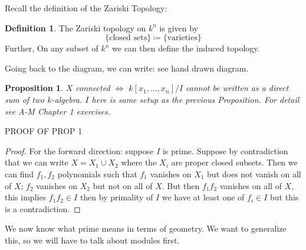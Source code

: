 \documentclass[12pt]{article}
\newtheorem{prop}[theorem]{Proposition}
\theoremstyle{definition}
\newtheorem{definition}[theorem]{Definition}
\begin{document}
Recall the definition of the Zariski Topology:
\begin{definition}
The Zariski topology on $k^n$ is given by
\[
\{\text{closed sets}\} \coloneqq \{\text{varieties}\}
\]
Further, On any subset of $k^n$ we can then define the induced topology.
\end{definition}
Going back to the diagram, we can write:
see hand drawn diagram.\\
\begin{prop}
$X$ connected $\iff$ $k[x_1,\dots,x_n]/I$ cannot be written as a direct sum of two $k$-algebra. $I$ here is same setup as the previous Proposition. For detail see A-M Chapter 1 exercises.
\end{prop}
PROOF OF PROP 1
\begin{proof}
For the forward direction: suppose $I$ is prime. Suppose by contradiction that we can write $X=X_1 \cup X_2$ where the $X_i$ are proper closed subsets. Then we can find $f_1,f_2$ polynomials such that $f_1$ vanishes on $X_1$ but does not vanish on all of $X$; $f_2$ vanishes on $X_2$ but not on all of $X$. But then $f_1f_2$ vanishes on all of $X$, this implies $f_1f_2 \in I$ then by primality of $I$ we have at least one of $f_i\in I$ but this is a contradiction. 
\end{proof}
We now know what prime means in terms of geometry. We want to generalize this, so we will have to talk about modules first.
\end{document}
